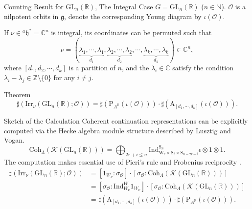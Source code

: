 \documentclass[fleqn,xcolor=dvipsnames]{beamer}
\newcommand{\BC}{{\mathbb {C}}}
\newcommand{\BN}{{\mathbb {N}}}
\newcommand{\BR}{{\mathbb {R}}}
\newcommand{\BZ}{{\mathbb {Z}}}
\newcommand{\CK}{{\mathcal {K}}}
\newcommand{\CO}{{\mathcal {O}}}
\newcommand{\RA}{{\mathrm {A}}}
\newcommand{\fg}{\mathfrak{g}}
\newcommand{\fh}{\mathfrak{h}}
\newcommand{\GL}{{\mathrm{GL}}}
\newcommand{\Ind}{{\mathrm{Ind}}}
\newcommand{\Irr}{{\mathrm{Irr}}}
\begin{document}
\begin{frame}{Counting Result for $\GL_n(\BR)$, The Integral Case}
  $G = \GL_n(\BR)$ ($n \in \BN$). $\CO$ is a nilpotent orbits in $\fg$, denote the corresponding Young diagram by $\iota(\CO)$.\par
    If $\nu \in {^{a}\fh^*} = \BC^n$ is integral, its coordinates can be permuted such that 
        \[
        \nu = (\underbrace{\lambda_1, \cdots, \lambda_1}_{d_1}, \underbrace{\lambda_2, \cdots, \lambda_2}_{d_2}, \cdots, \underbrace{\lambda_k, \cdots, \lambda_k}_{d_k}) \in \BC^n,
        \]
        where $[d_1, d_2, \cdots , d_k]$ is a partition of $n$, and the $\lambda_i \in \BC$ satisfy the condition $\lambda_i - \lambda_j \in \BZ \setminus \{0\}$ for any $i \neq j$.
  \begin{block}{Theorem}
        \begin{equation*}
            \sharp(\Irr_\nu(\GL_{n}(\BR);\CO)) = \sharp\left(\mathrm{P}_{A^{\BR}}(\iota(\CO))\right)\cdot \sharp\left(\RA_{[d_1,\cdots,d_k]}(\iota(\CO))\right).
        \end{equation*}
  \end{block}
\end{frame}





\begin{frame}{Sketch of the Calculation}
  Coherent continuation representations can be explicitly computed via the Hecke algebra module structure described by Lusztig and Vogan.
  \begin{equation*}
    \mathrm{Coh}_{\Lambda}(\CK(\GL_{n}(\BR))) = \bigoplus_{2r + i \leq n} \Ind _{\mathrm{W}_{r} \times \mathrm{S}_{i} \times \mathrm{S}_{n-2r-i}}^{\mathrm{S}_{n}} \epsilon \otimes 1 \otimes 1.
  \end{equation*}
  The computation makes essential use of \alert{Pieri's rule and Frobenius reciprocity} .
  \begin{align*}
    \sharp(\Irr_\nu(\GL_{n}(\BR);\CO)) &= [1_{W_\nu}:\sigma_{\CO}] \cdot [\sigma_{\CO}:\mathrm{Coh}_{\Lambda}(\CK(\GL_{n}(\BR)))]\\
    &= [\sigma_{\CO}:\Ind_{W_{\nu}}^{W}1_{W_{\nu}}] \cdot [\sigma_{\CO}:\mathrm{Coh}_{\Lambda}(\CK(\GL_{n}(\BR)))]\\
    & =  \sharp\left(\RA_{[d_1,\cdots,d_k]}(\iota(\CO))\right) \cdot \sharp\left(\mathrm{P}_{A^{\BR}}(\iota(\CO))\right).
  \end{align*}
\end{frame}
\end{document}
